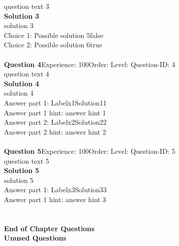 \documentclass{article}
\begin{document}
question text 3\\[4pt]
\noindent\textbf{Solution 3}\\[2pt]
solution 3\\[4pt]
Choice 1: \hspace{20pt}Possible solution 5\hspace{20pt}false\\
Choice 2: \hspace{20pt}Possible solution 6\hspace{20pt}true\\
\\[4pt]
\noindent\textbf{Question 4}\hspace{20pt}Experience: 100\hspace{20pt}Order: \hspace{20pt}Level: \hspace{20pt}Question-ID: 4\\[2pt]
question text 4\\[4pt]
\noindent\textbf{Solution 4}\\[2pt]
solution 4\\[4pt]
Answer part 1: \hspace{10pt}Label\hspace{10pt}x1\hspace{10pt}Solution\hspace{10pt}11\\
Answer part 1 hint: \hspace{15pt}answer hint 1\\
Answer part 2: \hspace{10pt}Label\hspace{10pt}x2\hspace{10pt}Solution\hspace{10pt}22\\
Answer part 2 hint: \hspace{15pt}answer hint 2\\
\\[4pt]
\noindent\textbf{Question 5}\hspace{20pt}Experience: 100\hspace{20pt}Order: \hspace{20pt}Level: \hspace{20pt}Question-ID: 5\\[2pt]
question text 5\\[4pt]
\noindent\textbf{Solution 5}\\[2pt]
solution 5\\[4pt]
Answer part 1: \hspace{10pt}Label\hspace{10pt}x3\hspace{10pt}Solution\hspace{10pt}33\\
Answer part 1 hint: \hspace{15pt}answer hint 3\\
\\[4pt]
\\[2pt]
\noindent\large{\textbf{End of Chapter Questions}}\\[15pt]
\noindent\Huge{\textbf{Unused Questions}}\\[10pt]
\noindent\large{}\\
\end{document}
